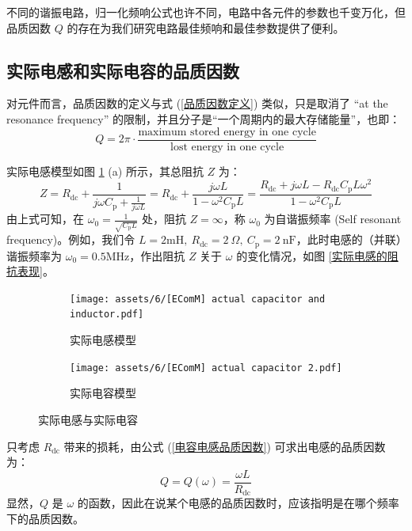\documentclass[UTF8]{report}
\def\nF{\ \mathrm{nF}}
\theoremstyle{MyLineTheoremStyle} %
\theoremstyle{MyBlockTheoremStyle} %
\theoremstyle{MySubsubsectionStyle} %
\begin{document}
不同的谐振电路，归一化频响公式也许不同，电路中各元件的参数也千变万化，但品质因数 $Q$ 的存在为我们研究电路最佳频响和最佳参数提供了便利。

\subsection{实际电感和实际电容的品质因数}
对元件而言，品质因数的定义与式 (\ref{品质因数定义}) 类似，只是取消了 ``at the resonance frequency'' 的限制，并且分子是“一个周期内的最大存储能量”，也即：
\begin{equation}\label{电容电感品质因数}
Q = 2 \pi \cdot  \frac{\text{maximum stored energy in one cycle}}{\text{lost energy in one cycle}}
\end{equation}


实际电感模型如图 \ref{实际电感与实际电容} (a) 所示，其总阻抗 $Z$ 为：
\begin{equation}
Z = R_{\text{dc}} + \frac{1}{j \omega C_{\text{p}} + \frac{1}{j \omega L}} =  R_{\text{dc}} + \frac{j \omega L}{1 - \omega^2 C_\text{p}L } = \frac{R_\text{dc} + j \omega L - R_\text{dc}C_\text{p}L \omega^2}{1 - \omega^2 C_\text{p}L}
\end{equation}
由上式可知，在 $\omega_0 = \frac{1}{\sqrt{C_{\text{p}}L}}$ 处，阻抗 $Z = \infty$，称 $\omega_0$ 为自谐振频率 (Self resonant frequency)。例如，我们令 $L = 2 \mathrm{mH},\ R_{\text{dc}} = 2 \ \Omega, \ C_{\text{p}} = 2 \nF$，此时电感的（并联）谐振频率为 $\omega_0 = 0.5 \mathrm{MHz}$，作出阻抗 $Z$ 关于 $\omega$ 的变化情况，如图 \ref{实际电感的阻抗表现}。


\begin{figure}[H]\centering
    \begin{subfigure}[b]{0.5\columnwidth}\centering
        \texttt{[image: assets/6/[EComM] actual capacitor and inductor.pdf]}
        \caption{实际电感模型}
    \end{subfigure}\hfill
    \begin{subfigure}[b]{0.5\columnwidth}\centering
        \texttt{[image: assets/6/[EComM] actual capacitor 2.pdf]}
        \caption{实际电容模型}
    \end{subfigure}
    \caption{实际电感与实际电容}
    \label{实际电感与实际电容}
\end{figure}

    只考虑 $R_{\text{dc}}$ 带来的损耗，由公式 (\ref{电容电感品质因数}) 可求出电感的品质因数为：
    \begin{equation}
    Q = Q(\omega) = \frac{\omega L}{R_{\text{dc}}}
    \end{equation}
    显然，$Q$ 是 $\omega$ 的函数，因此在说某个电感的品质因数时，应该指明是在哪个频率下的品质因数。
\end{document}
